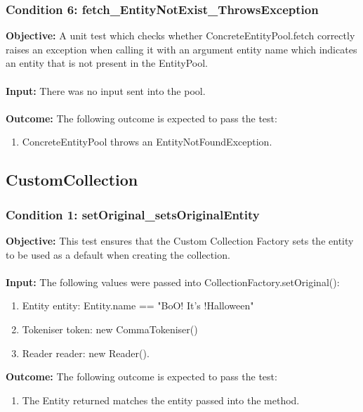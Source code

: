 \documentclass[a4paper,12pt]{article}
\begin{document}
		\subsubsection{Condition 6: fetch\_EntityNotExist\_ThrowsException}
			\textbf{Objective:} A unit test which checks whether ConcreteEntityPool.fetch correctly raises an exception when calling it with an argument entity name which indicates an entity that is not present in the EntityPool.\\\\
			\textbf{Input:} There was no input sent into the pool.\\\\
			\textbf{Outcome:} The following outcome is expected to pass the test:
				\begin{enumerate}
					\item ConcreteEntityPool throws an EntityNotFoundException.
				\end{enumerate}
	\subsection{CustomCollection}
		\subsubsection{Condition 1: setOriginal\_setsOriginalEntity}
			\textbf{Objective:} This test ensures that the Custom Collection Factory sets the entity to be used as a default when creating the collection.\\\\
			\textbf{Input:} The following values were passed into CollectionFactory.setOriginal():
				\begin{enumerate}
					\item Entity entity: Entity.name == "BoO! It's !Halloween"
					\item Tokeniser token: new CommaTokeniser()
					\item Reader reader: new Reader().
				\end{enumerate}
			\textbf{Outcome:} The following outcome is expected to pass the test:
				\begin{enumerate}
					\item The Entity returned matches the entity passed into the method.
				\end{enumerate}
\end{document}
